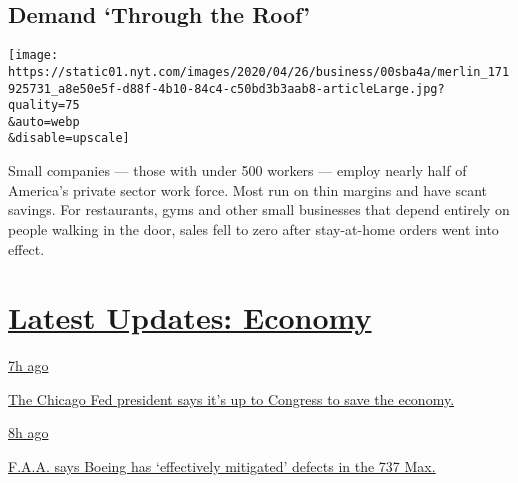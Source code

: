 \hypertarget{demand-through-the-roof}{%
\subsection{Demand `Through the Roof'}\label{demand-through-the-roof}}

\texttt{[image: https://static01.nyt.com/images/2020/04/26/business/00sba4a/merlin\_171925731\_a8e50e5f-d88f-4b10-84c4-c50bd3b3aab8-articleLarge.jpg?quality=75\\\&auto=webp\\\&disable=upscale]}

Small companies --- those with under 500 workers --- employ nearly half
of America's private sector work force. Most run on thin margins and
have scant savings. For restaurants, gyms and other small businesses
that depend entirely on people walking in the door, sales fell to zero
after stay-at-home orders went into effect.

\hypertarget{latest-updates-economy}{%
\section{\texorpdfstring{\href{https://www.nytimes.com/live/2020/08/03/business/stock-market-today-coronavirus?action=click\&pgtype=Article\&state=default\&region=MAIN_CONTENT_1\&context=storylines_live_updates}{Latest
Updates:
Economy}}{Latest Updates: Economy}}\label{latest-updates-economy}}

\href{https://www.nytimes.com/live/2020/08/03/business/stock-market-today-coronavirus?action=click\&pgtype=Article\&state=default\&region=MAIN_CONTENT_1\&context=storylines_live_updates\#the-chicago-fed-president-says-its-up-to-congress-to-save-the-economy}{7h
ago}

\href{https://www.nytimes.com/live/2020/08/03/business/stock-market-today-coronavirus?action=click\&pgtype=Article\&state=default\&region=MAIN_CONTENT_1\&context=storylines_live_updates\#the-chicago-fed-president-says-its-up-to-congress-to-save-the-economy}{The
Chicago Fed president says it's up to Congress to save the economy.}

\href{https://www.nytimes.com/live/2020/08/03/business/stock-market-today-coronavirus?action=click\&pgtype=Article\&state=default\&region=MAIN_CONTENT_1\&context=storylines_live_updates\#faa-says-boeing-has-effectively-mitigated-defects-in-the-737-max}{8h
ago}

\href{https://www.nytimes.com/live/2020/08/03/business/stock-market-today-coronavirus?action=click\&pgtype=Article\&state=default\&region=MAIN_CONTENT_1\&context=storylines_live_updates\#faa-says-boeing-has-effectively-mitigated-defects-in-the-737-max}{F.A.A.
says Boeing has `effectively mitigated' defects in the 737 Max.}


